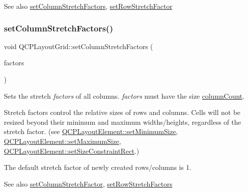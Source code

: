 \begin{DoxySeeAlso}{See also}
\mbox{\hyperlink{class_q_c_p_layout_grid_a6c2591d1a7e2534ce036989543b49e57}{set\+Column\+Stretch\+Factors}}, \mbox{\hyperlink{class_q_c_p_layout_grid_a7b0273de5369bd93d942edbaf5b166ec}{set\+Row\+Stretch\+Factor}} 
\end{DoxySeeAlso}
\mbox{\label{class_q_c_p_layout_grid_a6c2591d1a7e2534ce036989543b49e57}} 
\subsubsection{\texorpdfstring{setColumnStretchFactors()}{setColumnStretchFactors()}}
{\footnotesize\ttfamily void Q\+C\+P\+Layout\+Grid\+::set\+Column\+Stretch\+Factors (\begin{DoxyParamCaption}\item[{const Q\+List$<$ double $>$ \&}]{factors }\end{DoxyParamCaption})}

Sets the stretch {\itshape factors} of all columns. {\itshape factors} must have the size \mbox{\hyperlink{class_q_c_p_layout_grid_a1a2962cbf45011405b64b913afa8e7a2}{column\+Count}}.

Stretch factors control the relative sizes of rows and columns. Cells will not be resized beyond their minimum and maximum widths/heights, regardless of the stretch factor. (see \mbox{\hyperlink{class_q_c_p_layout_element_a5dd29a3c8bc88440c97c06b67be7886b}{Q\+C\+P\+Layout\+Element\+::set\+Minimum\+Size}}, \mbox{\hyperlink{class_q_c_p_layout_element_a74eb5280a737ab44833d506db65efd95}{Q\+C\+P\+Layout\+Element\+::set\+Maximum\+Size}}, \mbox{\hyperlink{class_q_c_p_layout_element_a361666cdcc6fbfd37344cc44be746b0f}{Q\+C\+P\+Layout\+Element\+::set\+Size\+Constraint\+Rect}}.)

The default stretch factor of newly created rows/columns is 1.

\begin{DoxySeeAlso}{See also}
\mbox{\hyperlink{class_q_c_p_layout_grid_ae38f31a71687b9d7ee3104852528fb50}{set\+Column\+Stretch\+Factor}}, \mbox{\hyperlink{class_q_c_p_layout_grid_a200b45f9c908f96ebadaa3c8d87a2782}{set\+Row\+Stretch\+Factors}} 
\end{DoxySeeAlso}
\mbox{\label{class_q_c_p_layout_grid_affc2f3cfd22f28698c5b29b960d2a391}} 
